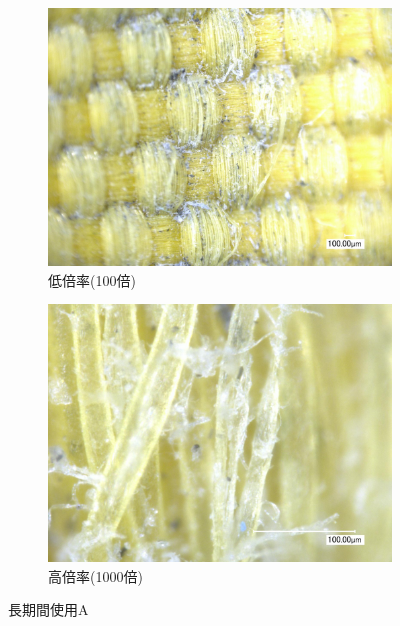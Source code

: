 \documentclass[main]{subfiles}
\begin{document}
\begin{figure}[H]
    \centering
    \begin{subfigure}[htbp]{0.45\linewidth}
        \centering
        \includegraphics[keepaspectratio, width=0.8\linewidth]{figures/縁/カーリングパッド長期低倍率.jpg}
        \caption{低倍率(100倍)}
        \label{fig:label}
    \end{subfigure}
    \begin{subfigure}[htbp]{0.45\linewidth}
        \centering
        \includegraphics[keepaspectratio, width=0.8\linewidth]{figures/縁/カーリングパッド長期.jpg}
        \caption{高倍率(1000倍)}
        \label{fig:label}
    \end{subfigure}
    \caption{長期間使用A}
    \label{fig:label}
\end{figure}
    
\end{document}
